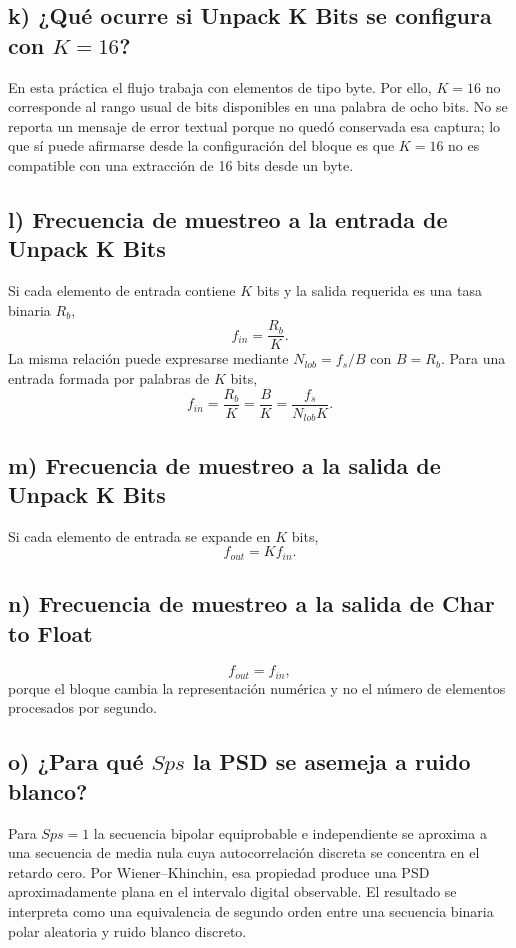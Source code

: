 \documentclass[journal]{IEEEtran}
\begin{document}
\subsection{k) ¿Qué ocurre si Unpack K Bits se configura con $K=16$?}
En esta práctica el flujo trabaja con elementos de tipo byte. Por ello, $K=16$ no corresponde al rango usual de bits disponibles en una palabra de ocho bits. No se reporta un mensaje de error textual porque no quedó conservada esa captura; lo que sí puede afirmarse desde la configuración del bloque es que $K=16$ no es compatible con una extracción de 16 bits desde un byte.

\subsection{l) Frecuencia de muestreo a la entrada de Unpack K Bits}
Si cada elemento de entrada contiene $K$ bits y la salida requerida es una tasa binaria $R_b$,
\begin{equation}
f_{in}=\frac{R_b}{K}.
\end{equation}
La misma relación puede expresarse mediante $N_{lob}=f_s/B$ con $B=R_b$. Para una entrada formada por palabras de $K$ bits,
\begin{equation}
f_{in}=\frac{R_b}{K}=\frac{B}{K}=\frac{f_s}{N_{lob}K}.
\end{equation}

\subsection{m) Frecuencia de muestreo a la salida de Unpack K Bits}
Si cada elemento de entrada se expande en $K$ bits,
\begin{equation}
f_{out}=Kf_{in}.
\end{equation}

\subsection{n) Frecuencia de muestreo a la salida de Char to Float}
\begin{equation}
f_{out}=f_{in},
\end{equation}
porque el bloque cambia la representación numérica y no el número de elementos procesados por segundo.

\subsection{o) ¿Para qué $Sps$ la PSD se asemeja a ruido blanco?}
Para $Sps=1$ la secuencia bipolar equiprobable e independiente se aproxima a una secuencia de media nula cuya autocorrelación discreta se concentra en el retardo cero. Por Wiener--Khinchin, esa propiedad produce una PSD aproximadamente plana en el intervalo digital observable. El resultado se interpreta como una equivalencia de segundo orden entre una secuencia binaria polar aleatoria y ruido blanco discreto.
\end{document}
